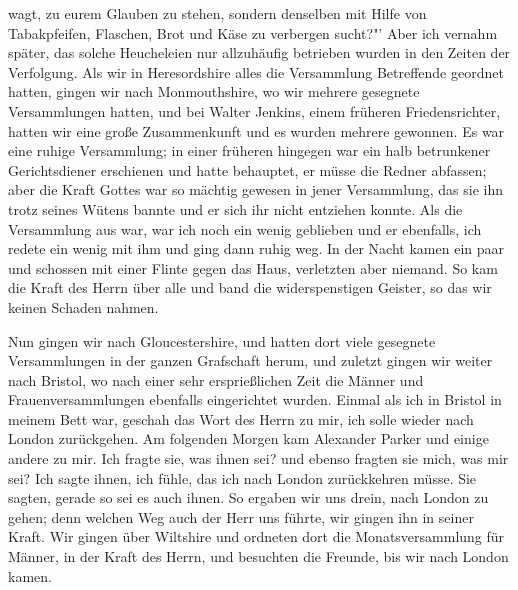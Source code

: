 wagt, zu eurem Glauben zu stehen, sondern denselben mit Hilfe
von Tabakpfeifen, Flaschen, Brot und Käse zu verbergen sucht?"'
Aber ich vernahm später, das solche Heucheleien nur allzuhäufig
betrieben wurden in den Zeiten der Verfolgung.
Als wir in Heresordshire alles die Versammlung Betreffende
geordnet hatten, gingen wir nach Monmouthshire, wo wir mehrere
gesegnete Versammlungen hatten, und bei Walter Jenkins, einem
früheren Friedensrichter, hatten wir eine große Zusammenkunft
und es wurden mehrere gewonnen. Es war eine ruhige Versammlung; 
in einer früheren hingegen war ein halb betrunkener Gerichtsdiener
erschienen und hatte behauptet, er müsse die Redner abfassen; 
aber die Kraft Gottes war so mächtig gewesen in jener
Versammlung, das sie ihn trotz seines Wütens bannte und er sich
ihr nicht entziehen konnte. Als die Versammlung aus war, war
ich noch ein wenig geblieben und er ebenfalls, ich redete ein
wenig mit ihm und ging dann ruhig weg. In der Nacht kamen
ein paar und schossen mit einer Flinte gegen das Haus, verletzten
aber niemand. So kam die Kraft des Herrn über alle und
band die widerspenstigen Geister, so das wir keinen Schaden
nahmen.

Nun gingen wir nach Gloucestershire, und hatten dort viele
gesegnete Versammlungen in der ganzen Grafschaft herum, und
zuletzt gingen wir weiter nach Bristol, wo nach einer sehr 
ersprießlichen Zeit die Männer und Frauenversammlungen ebenfalls eingerichtet wurden.
Einmal als ich in Bristol in meinem Bett war, geschah das
Wort des Herrn zu mir, ich solle wieder nach London zurückgehen.
Am folgenden Morgen kam Alexander Parker und einige andere
zu mir. Ich fragte sie, was ihnen sei? und ebenso fragten sie
mich, was mir sei? Ich sagte ihnen, ich fühle, das ich nach
London zurückkehren müsse. Sie sagten, gerade so sei es auch
ihnen. So ergaben wir uns drein, nach London zu gehen; denn
welchen Weg auch der Herr uns führte, wir gingen ihn in seiner
Kraft. Wir gingen über Wiltshire und ordneten dort die 
Monatsversammlung für Männer, in der Kraft des Herrn, und besuchten
die Freunde, bis wir nach London kamen.

